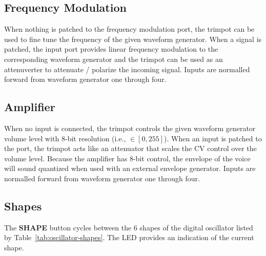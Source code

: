 \documentclass[12pt,letter]{article}
\begin{document}
\subsection{Frequency Modulation}

When nothing is patched to the frequency modulation port, the trimpot can be used to fine tune the frequency of the given waveform generator. When a signal is patched, the input port provides linear frequency modulation to the corresponding waveform generator and the trimpot can be used as an attenuverter to attenuate / polarize the incoming signal. Inputs are normalled forward from waveform generator one through four.

\subsection{Amplifier}

When no input is connected, the trimpot controls the given waveform generator volume level with 8-bit resolution (i.e., $\in [0, 255]$). When an input is patched to the port, the trimpot acts like an attenuator that scales the CV control over the volume level. Because the amplifier has 8-bit control, the envelope of the voice will sound quantized when used with an external envelope generator. Inputs are normalled forward from waveform generator one through four.

\subsection{Shapes}

The \textbf{SHAPE} button cycles between the 6 shapes of the digital oscillator listed by Table~\ref{tab:oscillator-shapes}. The LED provides an indication of the current shape.
\end{document}
